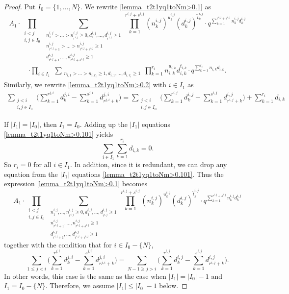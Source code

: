 \documentclass[12pt, reqno]{amsart}
\theoremstyle{definition}
\theoremstyle{remark}
\numberwithin{equation}{section}
\newcommand{\w}{\tilde}
\numberwithin{equation}{section}
\begin{document}
\begin{proof}
Put $I_0 = \{1, \ldots, N\}$. We rewrite \eqref{lemma_t2t1yq1toNm>0.1} as
$$
A_1 \cdot \prod_{\substack{i < j\\i, j \in I_0}}
\sum_{\substack{n_1^{i,j} > \ldots > n_{r^{i,j}}^{i,j} \ge 0, 
    d_1^{i,j}, \ldots, d_{r^{i,j}}^{i,j} \ge 1\\
    n_{r^{i,j}+1}^{i,j} > \ldots > n_{r^{i,j}+s^{i,j}}^{i,j} \ge 1\\
    d_{r^{i,j}+1}^{i,j}, \ldots, d_{r^{i,j}+s^{i,j}}^{i,j} \ge 1}}
  \prod_{k=1}^{r^{i,j}+s^{i,j}} (n_k^{i,j})^{u_k^{i,j}}
    (d_k^{i,j})^{\w t_k^{i,j}} 
\cdot q^{\sum_{k=1}^{r^{i,j}+s^{i,j}} n_k^{i,j} d_k^{i,j}}
$$
\begin{eqnarray}    \label{lemma_t2t1yq1toNm>0.100}
\cdot \prod_{i \in I_1} \,\,
\sum_{\substack{n_{i,1} > \ldots > n_{i, r_i} \ge 1, 
    d_{i,1}, \ldots, d_{i, r_i} \ge 1}}
\prod_{k=1}^{r_i} n_{i,k}^{u_{i,k}} d_{i,k}^{t_{i,k}} 
\cdot q^{\sum_{k=1}^{r_i} n_{i,k} d_{i,k}}.
\end{eqnarray}
Similarly, we rewrite \eqref{lemma_t2t1yq1toNm>0.2} with $i \in I_1$ as
\begin{eqnarray}    \label{lemma_t2t1yq1toNm>0.101}
\sum_{\substack{j < i\\i, j \in I_0}} \bigg (\sum_{k=1}^{r^{j,i}} d_k^{j,i} 
    - \sum_{k=1}^{s^{j,i}} d_{r^{j,i}+k}^{j,i} \bigg )
= \sum_{\substack{j < i\\i, j \in I_0}} 
    \bigg (\sum_{k=1}^{r^{i,j}} d_k^{i,j} 
    - \sum_{k=1}^{s^{i,j}} d_{r^{i,j}+k}^{i,j} \bigg )
  + \sum_{k=1}^{r_i} d_{i,k}
\end{eqnarray}

If $|I_1| = |I_0|$, then $I_1 = I_0$. 
Adding up the $|I_1|$ equations \eqref{lemma_t2t1yq1toNm>0.101} yields
$$
\sum_{i \in I_1} \sum_{k=1}^{r_i} d_{i,k} = 0.
$$
So $r_i = 0$ for all $i \in I_1$. In addition,
since it is redundant, we can drop any equation from 
the $|I_1|$ equations \eqref{lemma_t2t1yq1toNm>0.101}. 
Thus the expression \eqref{lemma_t2t1yq1toNm>0.1} becomes 
$$
A_1 \cdot \prod_{\substack{i < j\\i, j \in I_0}}
\sum_{\substack{n_1^{i,j}, \ldots, n_{r^{i,j}}^{i,j} \ge 0, 
    d_1^{i,j}, \ldots, d_{r^{i,j}}^{i,j} \ge 1\\
    n_{r^{i,j}+1}^{i,j}, \ldots, n_{r^{i,j}+s^{i,j}}^{i,j} \ge 1\\
    d_{r^{i,j}+1}^{i,j}, \ldots, d_{r^{i,j}+s^{i,j}}^{i,j} \ge 1}}
  \prod_{k=1}^{r^{i,j}+s^{i,j}} (n_k^{i,j})^{u_k^{i,j}}
    (d_k^{i,j})^{\w t_k^{i,j}} 
\cdot q^{\sum_{k=1}^{r^{i,j}+s^{i,j}} n_k^{i,j} d_k^{i,j}}
$$
together with the condition that for $i \in I_0 - \{N\}$,
$$
  \sum_{1 \le j < i} \bigg (\sum_{k=1}^{r^{j,i}} d_k^{j,i} 
    - \sum_{k=1}^{s^{j,i}} d_{r^{j,i}+k}^{j,i} \bigg )
= \sum_{N-1 \ge j > i} \bigg (\sum_{k=1}^{r^{i,j}} d_k^{i,j} 
    - \sum_{k=1}^{s^{i,j}} d_{r^{i,j}+k}^{i,j} \bigg ).
$$
In other words, this case is the same as the case when 
$|I_1| = |I_0|-1$ and $I_1 = I_0 - \{N\}$.
Therefore, we assume $|I_1| \le |I_0|-1$ below. 


\end{proof}
\end{document}
